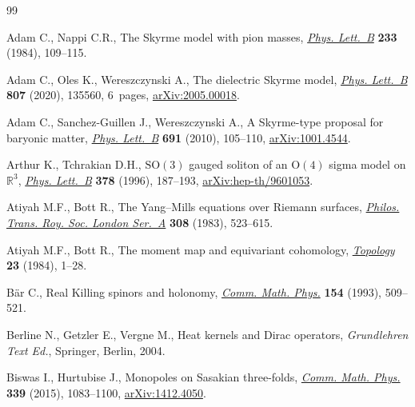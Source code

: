 \begin{thebibliography}{99}
\footnotesize\itemsep=0pt

Adam C., Nappi C.R., The {S}kyrme model with pion masses, \href{https://doi.org/10.1016/0550-3213(84)90172-X}{\textit{Phys.
 Lett.~B}} \textbf{233} (1984), 109--115.

Adam C., Oles K., Wereszczynski A., The dielectric {S}kyrme model,
 \href{https://doi.org/10.1016/j.physletb.2020.135560}{\textit{Phys. Lett.~B}} \textbf{807} (2020), 135560, 6~pages,
 \href{https://arxiv.org/abs/2005.00018}{arXiv:2005.00018}.

Adam C., Sanchez-Guillen J., Wereszczynski A., A {S}kyrme-type proposal for
 baryonic matter, \href{https://doi.org/10.1016/j.physletb.2010.06.025}{\textit{Phys. Lett.~B}} \textbf{691} (2010), 105--110,
 \href{https://arxiv.org/abs/1001.4544}{arXiv:1001.4544}.

Arthur K., Tchrakian D.H., {$\mathrm{SO}(3)$} gauged soliton of an {$\mathrm{O}(4)$} sigma model
 on {$\mathbb{R}^3$}, \href{https://doi.org/10.1016/0370-2693(96)00343-7}{\textit{Phys. Lett.~B}} \textbf{378} (1996), 187--193,
 \href{https://arxiv.org/abs/hep-th/9601053}{arXiv:hep-th/9601053}.

Atiyah M.F., Bott R., The {Y}ang--{M}ills equations over {R}iemann surfaces,
 \href{https://doi.org/10.1098/rsta.1983.0017}{\textit{Philos. Trans. Roy. Soc. London Ser.~A}} \textbf{308} (1983),
 523--615.

Atiyah M.F., Bott R., The moment map and equivariant cohomology,
 \href{https://doi.org/10.1016/0040-9383(84)90021-1}{\textit{Topology}} \textbf{23} (1984), 1--28.

B\"ar C., Real {K}illing spinors and holonomy, \href{https://doi.org/10.1007/BF02102106}{\textit{Comm. Math. Phys.}}
 \textbf{154} (1993), 509--521.

Berline N., Getzler E., Vergne M., Heat kernels and {D}irac operators,
 \textit{Grundlehren Text Ed.}, Springer, Berlin, 2004.

Biswas I., Hurtubise J., Monopoles on {S}asakian three-folds, \href{https://doi.org/10.1007/s00220-015-2444-3}{\textit{Comm.
 Math. Phys.}} \textbf{339} (2015), 1083--1100, \href{https://arxiv.org/abs/1412.4050}{arXiv:1412.4050}.


\end{thebibliography}

